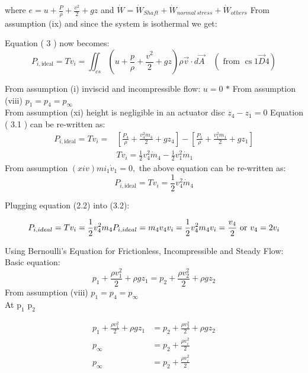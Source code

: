 where $e=u+\frac{P}{\rho}+\frac{v^2}{2}+gz $ and $\dot{W}=\dot{W}_{Shaft}+\dot{W}_{normal \, stress}+\dot{W}_{others}$
From assumption (ix) and since the system is isothermal we get:

Equation ( 3 ) now becomes:
\begin{equation}
P_{i, \text {ideal}}=T v_{i}=\iint_{c s}\left(u+\frac{p}{\rho}+\frac{v^{2}}{2}+g z\right) \rho \vec{v} \cdot d \vec{A} \quad(\text { from } \operatorname{cs} 1 \vec{D} 4)
\end{equation}

From assumption (i)  inviscid and incompressible flow: $u=0$ $*$ From assumption (viii) $ p_{1}=p_{4}=p_{\infty}$ \\
From assumption (xi) height is negligible in an actuator disc $ z_{4}-z_{1}=0$
Equation ( 3.1 ) can be re-written as:
\begin{align}
P_{i, \text {ideal}}=T v_{i}=&\left[\frac{P_{4}}{\rho}+\frac{v_{4}^{2} \dot{m}_{4}}{2}+g z_{4}\right]-\left[\frac{P_{1}}{\rho}+\frac{v_{1}^{2} m_{1}}{2}+g z_{1}\right] \\
& T v_{i}=\frac{1}{2} v_{4}^{2} \dot{m}_{4}-\frac{1}{2} v_{1}^{2} \dot{m}_{1}
\end{align}
From assumption $(x i v)  m i_{1} \dot{v}_{1}=0,$ the above equation can be re-written as:
\begin{equation}
P_{i, \text {ideal}}=T v_{i}=\frac{1}{2} v_{4}^{2} \dot{m}_{4}
\end{equation}

Plugging equation (2.2) into (3.2):

\begin{equation}
P_{i, i d e a l}=T v_{i}=\frac{1}{2} v_{4}^{2} m_{4} \\
P_{i, i d e a l}=m_{4} v_{4} v_{i}=\frac{1}{2} v_{4}^{2} m_{4} \\
 v_{i}=\frac{v_{4}}{2} \text { or } v_{4}=2 v_{i}
\end{equation}

Using Bernoulli's Equation for Frictionless, Incompressible and Steady Flow:
Basic equation: $$p_{1}+\frac{\rho v_{1}^{2}}{2}+\rho g z_{1}=p_{2}+\frac{\rho v_{2}^{2}}{2}+\rho g z_{2}$$
From assumption (viii) $ p_{1}=p_{4}=p_{\infty}$\\
At $\mathrm{p}_{1}$  $\mathrm{p}_{2}$

\begin{align}
p_{1}+\frac{\rho v_{1}^{2}}{2}+\rho g z_{1}&=p_{2}+\frac{\rho v_{2}^{2}}{2}+\rho g z_{2} \\
p_{\infty}&=p_{2}+\frac{\rho v_{i}^{2}}{2} \\
p_{\infty}&=p_{2}+\frac{\rho v_{i}^{2}}{2}
\end{align}

